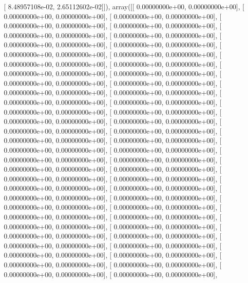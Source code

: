 \documentclass{article}
\begin{document}
       [  8.48957108e-02,   2.65112602e-02]]), array([[  0.00000000e+00,   0.00000000e+00],
       [  0.00000000e+00,   0.00000000e+00],
       [  0.00000000e+00,   0.00000000e+00],
       [  0.00000000e+00,   0.00000000e+00],
       [  0.00000000e+00,   0.00000000e+00],
       [  0.00000000e+00,   0.00000000e+00],
       [  0.00000000e+00,   0.00000000e+00],
       [  0.00000000e+00,   0.00000000e+00],
       [  0.00000000e+00,   0.00000000e+00],
       [  0.00000000e+00,   0.00000000e+00],
       [  0.00000000e+00,   0.00000000e+00],
       [  0.00000000e+00,   0.00000000e+00],
       [  0.00000000e+00,   0.00000000e+00],
       [  0.00000000e+00,   0.00000000e+00],
       [  0.00000000e+00,   0.00000000e+00],
       [  0.00000000e+00,   0.00000000e+00],
       [  0.00000000e+00,   0.00000000e+00],
       [  0.00000000e+00,   0.00000000e+00],
       [  0.00000000e+00,   0.00000000e+00],
       [  0.00000000e+00,   0.00000000e+00],
       [  0.00000000e+00,   0.00000000e+00],
       [  0.00000000e+00,   0.00000000e+00],
       [  0.00000000e+00,   0.00000000e+00],
       [  0.00000000e+00,   0.00000000e+00],
       [  0.00000000e+00,   0.00000000e+00],
       [  0.00000000e+00,   0.00000000e+00],
       [  0.00000000e+00,   0.00000000e+00],
       [  0.00000000e+00,   0.00000000e+00],
       [  0.00000000e+00,   0.00000000e+00],
       [  0.00000000e+00,   0.00000000e+00],
       [  0.00000000e+00,   0.00000000e+00],
       [  0.00000000e+00,   0.00000000e+00],
       [  0.00000000e+00,   0.00000000e+00],
       [  0.00000000e+00,   0.00000000e+00],
       [  0.00000000e+00,   0.00000000e+00],
       [  0.00000000e+00,   0.00000000e+00],
       [  0.00000000e+00,   0.00000000e+00],
       [  0.00000000e+00,   0.00000000e+00],
       [  0.00000000e+00,   0.00000000e+00],
       [  0.00000000e+00,   0.00000000e+00],
       [  0.00000000e+00,   0.00000000e+00],
       [  0.00000000e+00,   0.00000000e+00],
       [  0.00000000e+00,   0.00000000e+00],
       [  0.00000000e+00,   0.00000000e+00],
       [  0.00000000e+00,   0.00000000e+00],
       [  0.00000000e+00,   0.00000000e+00],
       [  0.00000000e+00,   0.00000000e+00],
       [  0.00000000e+00,   0.00000000e+00],
       [  0.00000000e+00,   0.00000000e+00],
       [  0.00000000e+00,   0.00000000e+00],
       [  0.00000000e+00,   0.00000000e+00],
       [  0.00000000e+00,   0.00000000e+00],
       [  0.00000000e+00,   0.00000000e+00],
       [  0.00000000e+00,   0.00000000e+00],
       [  0.00000000e+00,   0.00000000e+00],
       [  0.00000000e+00,   0.00000000e+00],
       [  0.00000000e+00,   0.00000000e+00],
\end{document}
